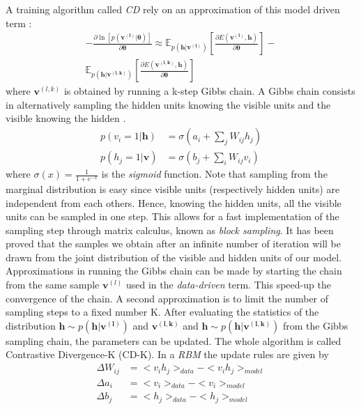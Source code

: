 \documentclass[letterpaper]{article}
\begin{document}
A training algorithm called \textit{CD} \cite{hinton2002training} rely on an approximation of this model driven term :
\begin{equation}
\label{eq:grad_log_like}
\begin{split}
- \frac{\partial \ln \left[ p(\bm{v^{(l)}}|\bm{\theta})\right]}{\partial \bm{\theta}}
\approx 
\mathbb{E}_{p(\bm{h}|\bm{v^{(l)}})} \left[ \frac{\partial E(\bm{v^{(l)}},\bm{h})}{\partial \bm{\theta}} \right] 
- \\
\mathbb{E}_{p(\bm{h} | \bm{v^{(l,k)}})} \left[ \frac{\partial E(\bm{v^{(l,k)}},\bm{h})}{\partial \bm{\theta}} \right]
\end{split}
\end{equation}
where $\bm{v}^{(l,k)}$ is obtained by running a k-step Gibbs chain. A Gibbs chain consists in alternatively sampling the hidden units knowing the visible units and the visible knowing the hidden .
\begin{align}
\label{eq:marginal_RBM}
p(v_{i}=1|\bm{h}) &= \sigma \left( a_{i} + \sum_{j}W_{ij}h_{j} \right)\\
p(h_{j}=1|\bm{v}) &= \sigma \left( b_{j} + \sum_{i}W_{ij}v_{i} \right)
\end{align}
where $\sigma	(x) = \frac{1}{1+e^{-x}}$ is the \textit{sigmoid} function. Note that sampling from the marginal distribution is easy since visible units (respectively hidden units) are independent from each others. Hence, knowing the hidden units, all the visible units can be sampled in one step. This allows for a fast implementation of the sampling step through matrix calculus, known as \textit{block sampling}.
It has been proved \cite{bengio2009learning} that the samples we obtain after an infinite number of iteration will be drawn from the joint distribution of the visible and hidden units of our model. Approximations in running the Gibbs chain can be made by starting the chain from the same sample $\bm{v}^{(l)}$ used in the \textit{data-driven} term. This speed-up the convergence of the chain. A second approximation is to limit the number of sampling steps to a fixed number K. After evaluating the statistics of the distribution $\bm{h} \sim p(\bm{h}|\bm{v^{(l)}})$ and $\bm{v^{(l,k)}}$ and $\bm{h}\sim p(\bm{h}|\bm{v^{(l,k)}})$ from the Gibbs sampling chain, the parameters can be updated. The whole algorithm is called Contrastive Divergence-K (CD-K). In a \textit{RBM} the update rules are given by
\begin{align}
\Delta W_{ij} &= <v_{i}h_{j} >_{data} - <v_{i}h_{j} >_{model}\\
\Delta a_{i} &= <v_{i}>_{data} - <v_{i}>_{model}\\
\Delta b_{j} &= <h_{j} >_{data} - <h_{j} >_{model}
\end{align}
\end{document}
